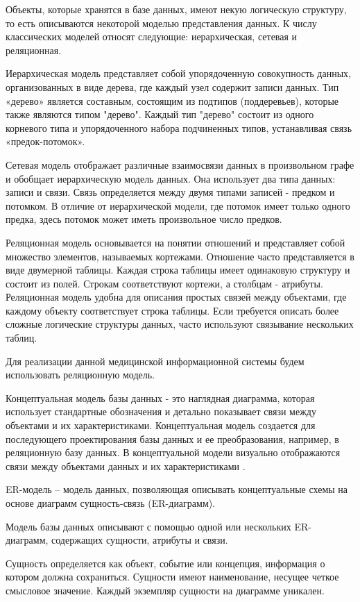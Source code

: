 Объекты, которые хранятся в базе данных, имеют некую логическую структуру, то есть описываются некоторой моделью представления данных. К числу классических моделей относят следующие: иерархическая, сетевая и реляционная.

Иерархическая модель представляет собой упорядоченную совокупность данных, организованных в виде дерева, где каждый узел содержит записи данных. Тип «дерево» является составным, состоящим из подтипов (поддеревьев), которые также являются типом "дерево". Каждый тип "дерево" состоит из одного корневого типа и упорядоченного набора подчиненных типов, устанавливая связь «предок-потомок».

Сетевая модель отображает различные взаимосвязи данных в произвольном графе и обобщает иерархическую модель данных. Она использует два типа данных: записи и связи. Связь определяется между двумя типами записей - предком и потомком. В отличие от иерархической модели, где потомок имеет только одного предка, здесь потомок может иметь произвольное число предков.

Реляционная модель основывается на понятии отношений и представляет собой множество элементов, называемых кортежами. Отношение часто представляется в виде двумерной таблицы. Каждая строка таблицы имеет одинаковую структуру и состоит из полей. Строкам соответствуют кортежи, а столбцам - атрибуты. Реляционная модель удобна для описания простых связей между объектами, где каждому объекту соответствует строка таблицы. Если требуется описать более сложные логические структуры данных, часто используют связывание нескольких таблиц.

Для реализации данной медицинской информационной системы будем использовать реляционную модель.

Концептуальная модель базы данных - это наглядная диаграмма, которая использует стандартные обозначения и детально показывает связи между объектами и их характеристиками. Концептуальная модель создается для последующего проектирования базы данных и ее преобразования, например, в реляционную базу данных. В концептуальной модели визуально отображаются связи между объектами данных и их характеристиками \cite{online4}.

ER-модель – модель данных, позволяющая описывать концептуальные схемы на основе диаграмм сущность-связь (ER-диаграмм).

Модель базы данных описывают с помощью одной или нескольких ER- диаграмм, содержащих сущности, атрибуты и связи.

Сущность определяется как объект, событие или концепция, информация о котором должна сохраниться. Сущности имеют наименование, несущее четкое смысловое значение. Каждый экземпляр сущности на диаграмме уникален.


